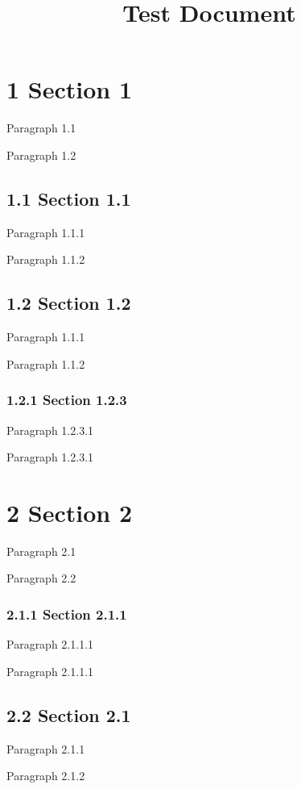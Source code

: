 \documentclass[11pt,a4paper]{article}
\title{Test Document}
\begin{document}
\maketitle

\section{1 Section 1}

Paragraph 1.1

Paragraph 1.2

\subsection{1.1 Section 1.1}

Paragraph 1.1.1

Paragraph 1.1.2

\subsection{1.2 Section 1.2}

Paragraph 1.1.1

Paragraph 1.1.2

\subsubsection{1.2.1 Section 1.2.3}

Paragraph 1.2.3.1

Paragraph 1.2.3.1

\section{2 Section 2}

Paragraph 2.1

Paragraph 2.2

\subsubsection{2.1.1 Section 2.1.1}

Paragraph 2.1.1.1

Paragraph 2.1.1.1

\subsection{2.2 Section 2.1}

Paragraph 2.1.1

Paragraph 2.1.2
\end{document}

